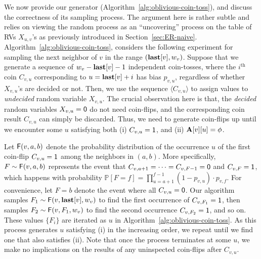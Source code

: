 We now provide our generator (Algorithm~\ref{alg:oblivious-coin-toss}), and discuss the correctness of its sampling process. The argument here is rather subtle and relies on viewing the random process as an ``uncovering'' process on the table of RVs $X_{u,v}$'s as previously introduced in Section~\ref{sec:ER-naive}.
Algorithm~\ref{alg:oblivious-coin-toss}, considers the following experiment for sampling the next neighbor of $v$ in the range $(\mathbf{last}[v],w_v)$.
Suppose that we generate a sequence of $w_v-\mathbf{last}[v]-1$ independent coin-tosses,
where the $i^\textrm{th}$ coin $C_{v,u}$ corresponding to $u = \mathbf{last}[v]+i$ has bias $p_{v,u}$,
regardless of whether $X_{v,u}$'s are decided or not.
Then, we use the sequence $\langle C_{v,u} \rangle$ to assign values to \emph{undecided} random variable $X_{v,u}$.
The crucial observation here is that, the \emph{decided} random variables $X_{v,u} = \mathsf{0}$ do not need coin-flips, and the corresponding coin result $C_{v,u}$ can simply be discarded.
Thus, we need to generate coin-flips up until we encounter some $u$ satisfying
both (i) $C_{v,u} = \mathsf{1}$, and (ii) $\mathbf{A}[v][u] = \phi$.


Let $\mathsf{F}(v,a,b)$ denote the probability distribution of the occurrence $u$ of the first coin-flip $C_{v,u} = \mathsf{1}$ among the neighbors in $(a, b)$.
More specifically, $F\sim\mathsf{F}(v,a,b)$ represents the event that $C_{v,a+1}=\cdots=C_{v,F-1}=\mathsf{0}$ and $C_{v,F}=\mathsf{1}$,
which happens with probability $\mathbb P[F=f]=\prod_{u=a+1}^{f-1} (1-p_{v,u}) \cdot p_{v,f}$.
For convenience, let $F = b$ denote the event where all $C_{v,u}=\mathsf{0}$. Our algorithm samples $F_1\sim\mathsf{F}(v,\mathbf{last}[v],w_v)$ to find the first occurrence of $C_{v,F_1} = \mathsf{1}$, then samples $F_2\sim\mathsf{F}(v,F_1,w_v)$ to find the second occurrence $C_{v,F_2} = \mathsf{1}$, and so on.
These values $\{F_i\}$ are iterated as $u$ in Algorithm~\ref{alg:oblivious-coin-toss}.
As this process generates $u$ satisfying (i) in the increasing order, we repeat until we find one that also satisfies (ii).
Note that once the process terminates at some $u$, we make no implications on the results of any uninspected coin-flips after $C_{v,u}$.

